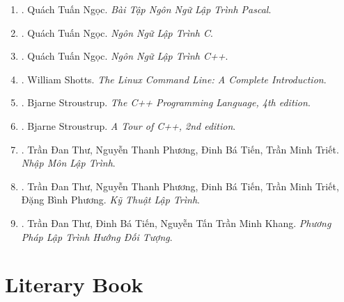 \documentclass{article}
\begin{document}
\begin{enumerate}
	\item \cite{Ngoc_BT_Pascal}. Quách Tuấn Ngọc. \textit{Bài Tập Ngôn Ngữ Lập Trình Pascal}.\hfill{\sf[reading]}
	\item \cite{Ngoc_C}. Quách Tuấn Ngọc. \textit{Ngôn Ngữ Lập Trình C}.\hfill{\sf[reading]}
	\item \cite{Ngoc_C++}. Quách Tuấn Ngọc. \textit{Ngôn Ngữ Lập Trình C++}.\hfill{\sf[finished]}
	\item \cite{Shotts2019}. William Shotts. \textit{The Linux Command Line: A Complete Introduction}.\hfill{\sf[reading]}
	\item \cite{Stroustrup2013}. Bjarne Stroustrup. \textit{The C++ Programming Language, 4th edition}.\hfill{\sf[reading]}
	\item \cite{Stroustrup2018}. Bjarne Stroustrup. \textit{A Tour of C++, 2nd edition}.\hfill{\sf[reading]}
	\item \cite{Thu_Phuong_Tien_Triet_NMLT}. Trần Đan Thư, Nguyễn Thanh Phương, Đinh Bá Tiến, Trần Minh Triết. \textit{Nhập Môn Lập Trình}.\hfill{\sf[reading]}
	\item \cite{Thu_Phuong_Tien_Triet_Phuong_KTLT}. Trần Đan Thư, Nguyễn Thanh Phương, Đinh Bá Tiến, Trần Minh Triết, Đặng Bình Phương. \textit{Kỹ Thuật Lập Trình}.\hfill{\sf[reading]}
	\item \cite{Thu_Tien_Khang_PPLTHDT}. Trần Đan Thư, Đinh Bá Tiến, Nguyễn Tấn Trần Minh Khang. \textit{Phương Pháp Lập Trình Hướng Đối Tượng}.\hfill{\sf[reading]}
\end{enumerate}


\section{Literary Book}
\end{document}
